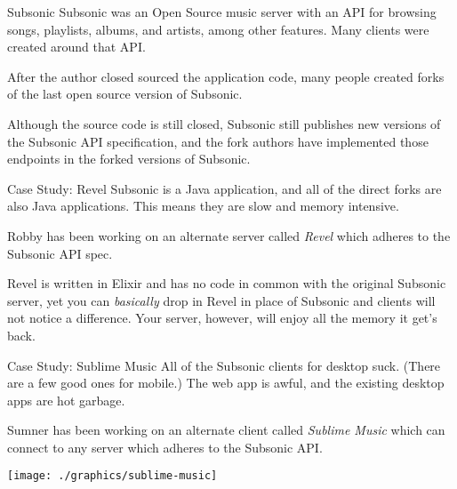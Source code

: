\documentclass{acm}
\begin{document}
\begin{frame}{Subsonic}
    Subsonic was an Open Source music server with an API for browsing songs,
    playlists, albums, and artists, among other features. Many clients were
    created around that API.
    \pause

    After the author closed sourced the application code, many people created
    forks of the last open source version of Subsonic.
    \pause

    Although the source code is still closed, Subsonic still publishes new
    versions of the Subsonic API specification, and the fork authors have
    implemented those endpoints in the forked versions of Subsonic.
\end{frame}

\begin{frame}{Case Study: Revel}
    Subsonic is a Java application, and all of the direct forks are also Java
    applications. This means they are slow and memory intensive.

    Robby has been working on an alternate server called \textit{Revel} which
    adheres to the Subsonic API spec.
    \pause

    Revel is written in Elixir and has no code in common with the original
    Subsonic server, yet you can \textit{basically} drop in Revel in place of Subsonic
    and clients will not notice a difference. Your server, however, will enjoy
    all the memory it get's back.
\end{frame}

\begin{frame}{Case Study: Sublime Music}
    All of the Subsonic clients for desktop suck. (There are a few good ones for
    mobile.) The web app is awful, and the existing desktop apps are hot
    garbage.

    Sumner has been working on an alternate client called \textit{Sublime Music}
    which can connect to any server which adheres to the Subsonic API.

    \begin{center}
        \texttt{[image: ./graphics/sublime-music]}
    \end{center}
\end{frame}

\end{document}
